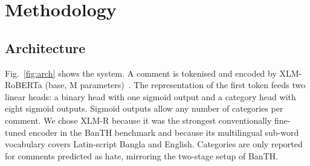 \documentclass[conference,letterpaper,10pt]{IEEEtran}
\begin{document}
\section{Methodology}

\subsection{Architecture}
Fig.~\ref{fig:arch} shows the system. A comment is tokenised and encoded by XLM-RoBERTa (base, \nParams{}M parameters)~\cite{conneau2020xlmr}. The representation of the first token feeds two linear heads: a binary head with one sigmoid output and a category head with eight sigmoid outputs. Sigmoid outputs allow any number of categories per comment. We chose XLM-R because it was the strongest conventionally fine-tuned encoder in the BanTH benchmark and because its multilingual sub-word vocabulary covers Latin-script Bangla and English. Categories are only reported for comments predicted as hate, mirroring the two-stage setup of BanTH.
\end{document}
